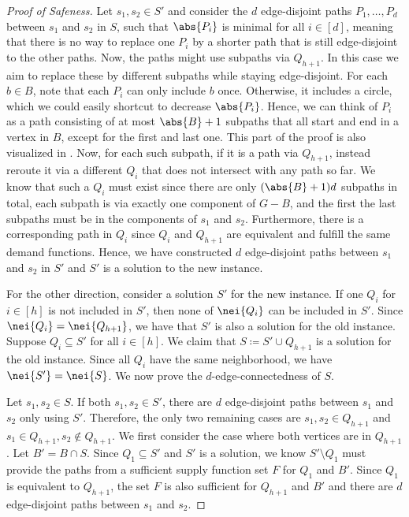 \begin{lemma}
\begin{lemma}
\begin{lemma}
\begin{lemma}
\begin{lemma}
\begin{theorem}
\begin{reduction*}
\begin{lemma}
\begin{reduction*}
\begin{reduction*}
\begin{proof}[Proof of Safeness]
  Let $s_1, s_2 \in S'$ and consider the $d$ edge-disjoint paths $P_1, \ldots, P_d$ between $s_1$ and $s_2$ in $S$, such that $\abs{P_i}$ is minimal for all $i \in [d]$, meaning that there is no way to replace one $P_i$ by a shorter path that is still edge-disjoint to the other paths. Now, the paths might use subpaths via $Q_{h+1}$. In this case we aim to replace these by different subpaths while staying edge-disjoint. For each $b \in B$, note that each $P_i$ can only include $b$ once. Otherwise, it includes a circle, which we could easily shortcut to decrease $\abs{P_i}$. Hence, we can think of $P_i$ as a path consisting of at most $\abs{B}+1$ subpaths that all start and end in a vertex in $B$, except for the first and last one. This part of the proof is also visualized in . Now, for each such subpath, if it is a path via $Q_{h+1}$, instead reroute it via a different $Q_i$ that does not intersect with any path so far. We know that such a $Q_i$ must exist since there are only $(\abs{B}+1)d$ subpaths in total, each subpath is via exactly one component of $G-B$, and the first the last subpaths must be in the components of $s_1$ and $s_2$.  Furthermore, there is a corresponding path in $Q_i$ since $Q_i$ and $Q_{h+1}$ are equivalent and fulfill the same demand functions. Hence, we have constructed $d$ edge-disjoint paths between $s_1$ and $s_2$ in $S'$ and $S'$ is a solution to the new instance.

  For the other direction, consider a solution $S'$ for the new instance. If one $Q_i$ for $i \in [h]$ is not included in $S'$, then none of $\nei{Q_i}$ can be included in $S'$. Since $\nei{Q_i} = \nei{Q_{h+1}}$, we have that $S'$ is also a solution for the old instance.
  Suppose $Q_i \subseteq S'$ for all $i \in [h]$. We claim that $S \coloneqq S' \cup Q_{h+1}$ is a solution for the old instance. Since all $Q_i$ have the same neighborhood, we have $\nei{S'} = \nei{S}$. We now prove the $d$-edge-connectedness of $S$.

  Let $s_1, s_2 \in S$. If both $s_1, s_2 \in S'$, there are $d$ edge-disjoint paths between $s_1$ and $s_2$ only using $S'$. Therefore, the only two remaining cases are $s_1, s_2 \in Q_{h+1}$ and $s_1 \in Q_{h+1}, s_2 \notin Q_{h+1}$. We first consider the case where both vertices are in $Q_{h+1}$. Let $B' = B \cap S$. Since $Q_1 \subseteq S'$ and $S'$ is a solution, we know $S' \setminus Q_1$ must provide the paths from a sufficient supply function set $F$ for $Q_1$ and $B'$. Since $Q_1$ is equivalent to $Q_{h+1}$, the set $F$ is also sufficient for $Q_{h+1}$ and $B'$ and there are $d$ edge-disjoint paths between $s_1$ and $s_2$.


\end{proof}
\end{reduction*}
\end{reduction*}
\end{lemma}
\end{reduction*}
\end{theorem}
\end{lemma}
\end{lemma}
\end{lemma}
\end{lemma}
\end{lemma}
